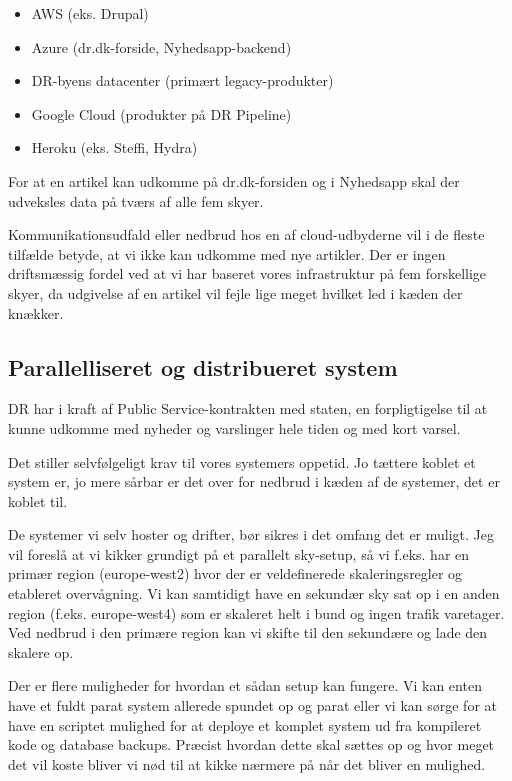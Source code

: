 \documentclass{article}
\begin{document}
\begin{itemize}
    \item AWS (eks. Drupal)
    \item Azure (dr.dk-forside, Nyhedsapp-backend)
    \item DR-byens datacenter (primært legacy-produkter)
    \item Google Cloud (produkter på DR Pipeline)
    \item Heroku (eks. Steffi, Hydra)
\end{itemize}

For at en artikel kan udkomme på dr.dk-forsiden og i Nyhedsapp skal der udveksles data på tværs af alle fem skyer.

Kommunikationsudfald eller nedbrud hos en af cloud-udbyderne vil i de fleste tilfælde betyde, at vi ikke kan udkomme med nye artikler. Der er ingen driftsmæssig fordel ved at vi har baseret vores infrastruktur på fem forskellige skyer, da udgivelse af en artikel vil fejle lige meget hvilket led i kæden der knækker. 


\subsection{Parallelliseret og distribueret system}
DR har i kraft af Public Service-kontrakten med staten, en forpligtigelse til at kunne udkomme med nyheder og varslinger hele tiden og med kort varsel.

Det stiller selvfølgeligt krav til vores systemers oppetid. Jo tættere koblet et system er, jo mere sårbar er det over for nedbrud i kæden af de systemer, det er koblet til.

De systemer vi selv hoster og drifter, bør sikres i det omfang det er muligt. Jeg vil foreslå at vi kikker grundigt på et parallelt sky-setup, så vi f.eks. har en primær region (europe-west2) hvor der er veldefinerede skaleringsregler og etableret overvågning.
Vi kan samtidigt have en sekundær sky sat op i en anden region (f.eks. europe-west4) som er skaleret helt i bund og ingen trafik varetager.
Ved nedbrud i den primære region kan vi skifte til den sekundære og lade den skalere op.

Der er flere muligheder for hvordan et sådan setup kan fungere. Vi kan enten have et fuldt parat system allerede spundet op og parat eller vi kan sørge for at have en scriptet mulighed for at deploye et komplet system ud fra kompileret kode og database backups. Præcist hvordan dette skal sættes op og hvor meget det vil koste bliver vi nød til at kikke nærmere på når det bliver en mulighed.
\end{document}
